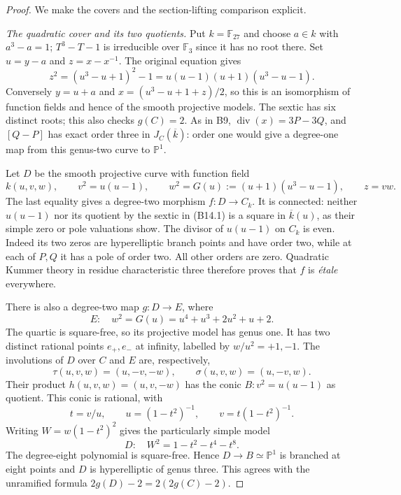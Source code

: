 \begin{proof}
We make the covers and the section-lifting comparison explicit.

\emph{The quadratic cover and its two quotients.}
Put $k=\mathbb F_{27}$ and choose $a\in k$ with $a^3-a=1$;
$T^3-T-1$ is irreducible over $\mathbb F_3$ since it has no root there.
Set $u=y-a$ and $z=x-x^{-1}$. The original equation gives
\[
 z^2=(u^3-u+1)^2-1
    =u(u-1)(u+1)(u^3-u-1).
 \tag{B14.1}
\]
Conversely $y=u+a$ and $x=(u^3-u+1+z)/2$, so this is an
isomorphism of function fields and hence of the smooth projective
models. The sextic has six distinct roots; this also checks $g(C)=2$.
As in B9, $\operatorname{div}(x)=3P-3Q$, and $[Q-P]$ has exact
order three in $J_C(\overline k)$: order one would give a degree-one
map from this genus-two curve to $\mathbb P^1$.

Let $D$ be the smooth projective curve with function field
\[
 k(u,v,w),\qquad
 v^2=u(u-1),\qquad
 w^2=G(u):=(u+1)(u^3-u-1),
 \qquad z=vw.
 \tag{B14.2}
\]
The last equality gives a degree-two morphism $f:D\to C_k$.
It is connected: neither $u(u-1)$ nor its quotient by the sextic
in (B14.1) is a square in $\overline k(u)$, as their simple zero
or pole valuations show. The divisor of $u(u-1)$ on $C_k$ is even.
Indeed its two zeros are hyperelliptic branch points and have order
two, while at each of $P,Q$ it has a pole of order two. All other
orders are zero. Quadratic Kummer theory in residue characteristic
three therefore proves that $f$ is \emph{\'etale} everywhere.

There is also a degree-two map $g:D\to E$, where
\[
             E:\quad w^2=G(u)=u^4+u^3+2u^2+u+2.
 \tag{B14.3}
\]
The quartic is square-free, so its projective model has genus one.
It has two distinct rational points $e_+,e_-$ at infinity,
labelled by $w/u^2=+1,-1$. The involutions of $D$ over $C$ and
$E$ are, respectively,
\[
 \tau(u,v,w)=(u,-v,-w),\qquad
 \sigma(u,v,w)=(u,-v,w).
\]
Their product $h(u,v,w)=(u,v,-w)$ has the conic
$B:v^2=u(u-1)$ as quotient. This conic is rational, with
\[
 t=v/u,\qquad u=(1-t^2)^{-1},\qquad v=t(1-t^2)^{-1}.
\]
Writing $W=w(1-t^2)^2$ gives the particularly simple model
\[
                D:\quad W^2=1-t^2-t^4-t^8.
 \tag{B14.4}
\]
The degree-eight polynomial is square-free. Hence $D\to B\simeq
\mathbb P^1$ is branched at eight points and $D$ is hyperelliptic
of genus three. This agrees with the unramified formula
$2g(D)-2=2(2g(C)-2)$.


\end{proof}
